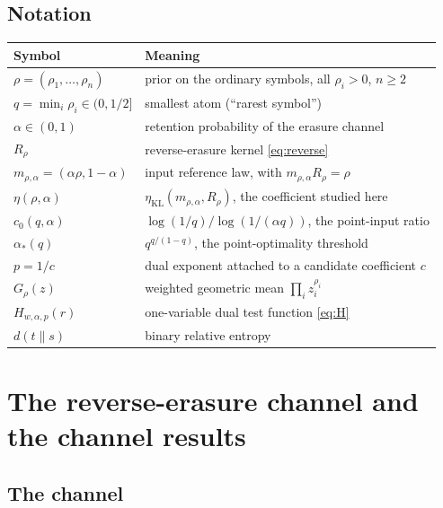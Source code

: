 \documentclass[11pt,a4paper]{article}
\numberwithin{equation}{section}
\theoremstyle{definition}
\theoremstyle{remark}
\newcommand{\etaKL}{\eta_{\mathrm{KL}}}
\newcommand{\mra}{m_{\rho,\alpha}}
\newcommand{\ac}{\alpha_*}
\begin{document}
\subsection{Notation}

\begin{center}
\small
\renewcommand{\arraystretch}{1.2}
\begin{tabular}{@{}ll@{}}
\toprule
Symbol & Meaning\\
\midrule
\(\rho=(\rho_1,\ldots,\rho_n)\) & prior on the ordinary symbols, all \(\rho_i>0\), \(n\ge2\)\\
\(q=\min_i\rho_i\in(0,1/2]\) & smallest atom (``rarest symbol'')\\
\(\alpha\in(0,1)\) & retention probability of the erasure channel\\
\(R_\rho\) & reverse-erasure kernel \eqref{eq:reverse}\\
\(\mra=(\alpha\rho,1-\alpha)\) & input reference law, with \(\mra R_\rho=\rho\)\\
\(\eta(\rho,\alpha)\) & \(\etaKL(\mra,R_\rho)\), the coefficient studied here\\
\(c_0(q,\alpha)\) & \(\log(1/q)/\log(1/(\alpha q))\), the point-input ratio\\
\(\ac(q)\) & \(q^{q/(1-q)}\), the point-optimality threshold\\
\(p=1/c\) & dual exponent attached to a candidate coefficient \(c\)\\
\(G_\rho(z)\) & weighted geometric mean \(\prod_i z_i^{\rho_i}\)\\
\(H_{w,\alpha,p}(r)\) & one-variable dual test function \eqref{eq:H}\\
\(d(t\|s)\) & binary relative entropy\\
\bottomrule
\end{tabular}
\end{center}

\section{The reverse-erasure channel and the channel results}\label{sec:main}

\subsection{The channel}
\end{document}
